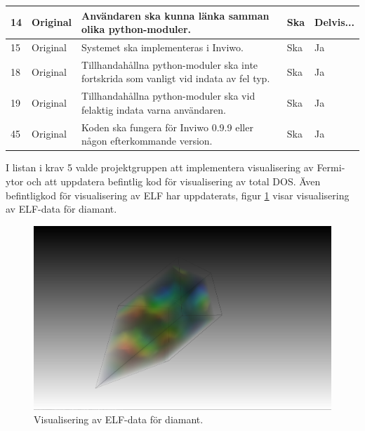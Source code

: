 \documentclass[a4paper,12pt]{article}
\begin{document}
\begin{table}[H]
\begin{center}
\begin{tabular}{ |p{10mm}|p{20mm}|p{70mm}|p{15mm}|p{15mm}|}
\hline
14 & Original & Användaren ska kunna länka samman olika python-moduler. & Ska & Delvis... \\
\hline
15 & Original & Systemet ska implementeras i Inviwo. & Ska & Ja \\
\hline
18 & Original & Tillhandahållna python-moduler ska inte fortskrida som vanligt vid indata av fel typ. & Ska & Ja \\
\hline
19 & Original & Tillhandahållna python-moduler ska vid felaktig indata varna användaren. & Ska & Ja \\
\hline
45 & Original & Koden ska fungera för Inviwo 0.9.9 eller någon efterkommande version. & Ska & Ja \\
\hline

\end{tabular}
\label{table:kravlista generella systemet}
\end{center}
\end{table}

I listan i krav 5 valde projektgruppen att implementera visualisering av Fermi-ytor och att uppdatera befintlig kod för visualisering av total DOS. %
Även befintligkod för visualisering av ELF har uppdaterats, figur \ref{fig:visualisering_diamant_elf} visar visualisering av ELF-data för diamant. 
\begin{figure}[H]
	\centering
	\includegraphics[scale=0.2]{Diamant_elf_visualisering.png}
	\caption{Visualisering av ELF-data för diamant.}
	\label{fig:visualisering_diamant_elf}
\end{figure}
\end{document}
